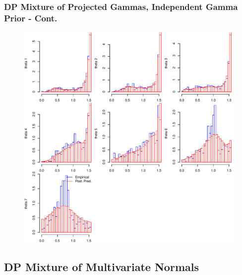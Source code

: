 \documentclass[aspectratio=169]{beamer}
\begin{document}
\begin{frame}
  \frametitle{DP Mixture of Projected Gammas, Independent Gamma Prior - Cont.}
  \begin{figure}
    \centering
    \includegraphics[scale = 0.43]{./images/dpmpg_emp_v_pred_decluster}
  \end{figure}
\end{frame}

\subsection{DP Mixture of Multivariate Normals}
\end{document}
